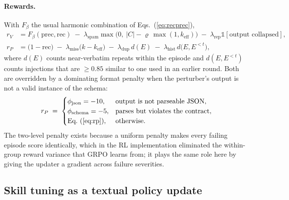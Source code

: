 \documentclass{article} %
\begin{document}
\paragraph{Rewards.} With $F_\beta$ the usual harmonic combination of Eqs.~(\ref{eq:recprec}),
\begin{align}
r_V &= F_\beta(\mathrm{prec}, \mathrm{rec})
\;-\; \lambda_{\mathrm{spam}} \max\!\big(0,\ |C| - \varrho\, \max(1,k_{\mathrm{eff}})\big)
\;-\; \lambda_{\mathrm{rep}} \mathbb{1}[\text{output collapsed}], \label{eq:rv}\\[2pt]
r_P &= \big(1 - \mathrm{rec}\big)
\;-\; \lambda_{\mathrm{miss}}\big(k - k_{\mathrm{eff}}\big)
\;-\; \lambda_{\mathrm{dup}}\, d(E)
\;-\; \lambda_{\mathrm{hist}}\, d\big(E, E^{<t}\big), \label{eq:rp}
\end{align}
where $d(E)$ counts near-verbatim repeats within the episode and $d(E, E^{<t})$ counts
injections that are $\geq 0.85$ similar to one used in an earlier round. Both are overridden
by a dominating format penalty when the perturber's output is not a valid instance of the
schema:
\begin{equation}
r_P \;=\;
\begin{cases}
\phi_{\mathrm{json}} = -10, & \text{output is not parseable JSON},\\
\phi_{\mathrm{schema}} = -5, & \text{parses but violates the contract},\\
\text{Eq.~(\ref{eq:rp})}, & \text{otherwise.}
\end{cases}
\label{eq:format}
\end{equation}
The two-level penalty exists because a uniform penalty makes every failing episode score
identically, which in the RL implementation eliminated the within-group reward variance that
GRPO learns from; it plays the same role here by giving the updater a gradient across
failure severities.

\subsection{Skill tuning as a textual policy update}
\end{document}
